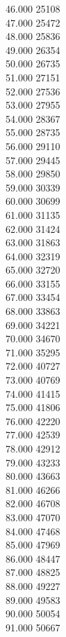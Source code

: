 { 46.000	25108 \\
 47.000	25472 \\
 48.000	25836 \\
 49.000	26354 \\
 50.000	26735 \\
 51.000	27151 \\
 52.000	27536 \\
 53.000	27955 \\
 54.000	28367 \\
 55.000	28735 \\
 56.000	29110 \\
 57.000	29445 \\
 58.000	29850 \\
 59.000	30339 \\
 60.000	30699 \\
 61.000	31135 \\
 62.000	31424 \\
 63.000	31863 \\
 64.000	32319 \\
 65.000	32720 \\
 66.000	33155 \\
 67.000	33454 \\
 68.000	33863 \\
 69.000	34221 \\
 70.000	34670 \\
 71.000	35295 \\
 72.000	40727 \\
 73.000	40769 \\
 74.000	41415 \\
 75.000	41806 \\
 76.000	42220 \\
 77.000	42539 \\
 78.000	42912 \\
 79.000	43233 \\
 80.000	43663 \\
 81.000	46266 \\
 82.000	46708 \\
 83.000	47070 \\
 84.000	47468 \\
 85.000	47969 \\
 86.000	48447 \\
 87.000	48825 \\
 88.000	49227 \\
 89.000	49583 \\
 90.000	50054 \\
 91.000	50667 \\
}
